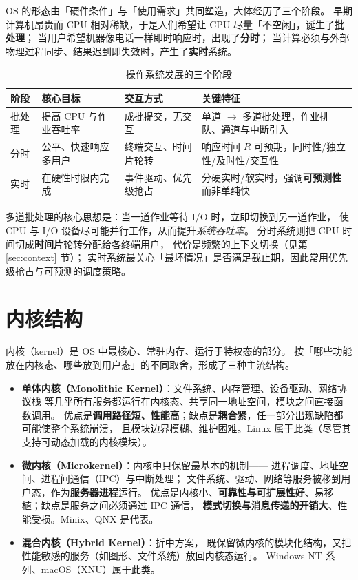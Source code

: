 OS 的形态由「硬件条件」与「使用需求」共同塑造，大体经历了三个阶段。
早期计算机昂贵而 CPU 相对稀缺，于是人们希望让 CPU 尽量「不空闲」，诞生了\textbf{批处理}；
当用户希望机器像电话一样即时响应时，出现了\textbf{分时}；
当计算必须与外部物理过程同步、结果迟到即失效时，产生了\textbf{实时}系统。

\begin{table}[H]
\centering
\caption{操作系统发展的三个阶段}
\begin{tabulary}{\textwidth}{LLLL}
\toprule
阶段 & 核心目标 & 交互方式 & 关键特征 \\
\midrule
批处理 & 提高 CPU 与作业吞吐率 & 成批提交，无交互 & 单道 $\to$ 多道批处理，作业排队、通道与中断引入 \\
分时 & 公平、快速响应多用户 & 终端交互、时间片轮转 & 响应时间 $R$ 可预期，同时性/独立性/及时性/交互性 \\
实时 & 在硬性时限内完成 & 事件驱动、优先级抢占 & 分硬实时/软实时，强调\textbf{可预测性}而非单纯快 \\
\bottomrule
\end{tabulary}
\end{table}

\noindent 多道批处理的核心思想是：当一道作业等待 I/O 时，立即切换到另一道作业，
使 CPU 与 I/O 设备尽可能并行工作，从而提升\emph{系统吞吐率}。
分时系统则把 CPU 时间切成\textbf{时间片}轮转分配给各终端用户，
代价是频繁的上下文切换（见第 \ref{sec:context} 节）；
实时系统最关心「最坏情况」是否满足截止期，因此常用优先级抢占与可预测的调度策略。

\section{内核结构}

内核（kernel）是 OS 中最核心、常驻内存、运行于特权态的部分。
按「哪些功能放在内核态、哪些放到用户态」的不同取舍，形成了三种主流结构。

\begin{itemize}
    \item \textbf{单体内核（Monolithic Kernel）}：文件系统、内存管理、设备驱动、网络协议栈
        等几乎所有服务都运行在内核态、共享同一地址空间，模块之间直接函数调用。
        优点是\textbf{调用路径短、性能高}；缺点是\textbf{耦合紧}，任一部分出现缺陷都可能使整个系统崩溃，
        且模块边界模糊、维护困难。Linux 属于此类（尽管其支持可动态加载的内核模块）。
    \item \textbf{微内核（Microkernel）}：内核中只保留最基本的机制——
        进程调度、地址空间、进程间通信（IPC）与中断处理；
        文件系统、驱动、网络等服务被移到用户态，作为\textbf{服务器进程}运行。
        优点是内核小、\textbf{可靠性与可扩展性好}、易移植；缺点是服务之间必须通过 IPC 通信，
        \textbf{模式切换与消息传递的开销大}、性能受损。Minix、QNX 是代表。
    \item \textbf{混合内核（Hybrid Kernel）}：折中方案，
        既保留微内核的模块化结构，又把性能敏感的服务（如图形、文件系统）放回内核态运行。
        Windows NT 系列、macOS（XNU）属于此类。
\end{itemize}

